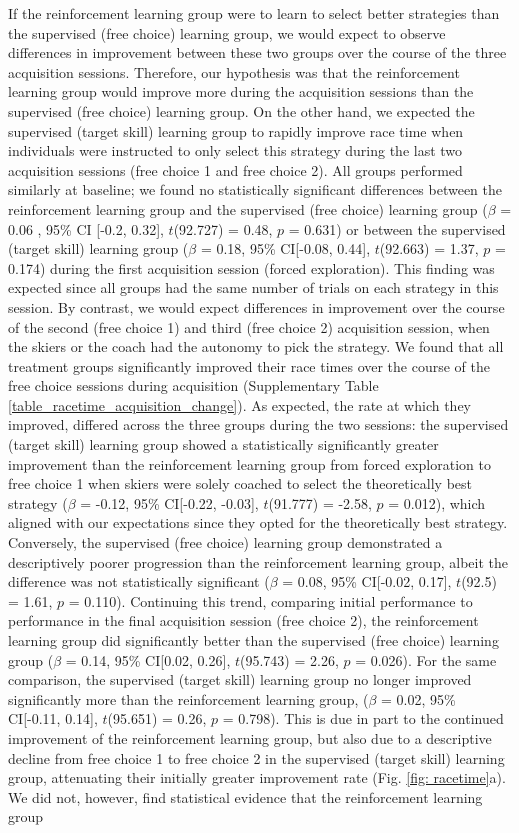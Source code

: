 \documentclass[pdflatex,sn-mathphys-num]{sn-jnl}%
\theoremstyle{thmstyleone}%
\theoremstyle{thmstyletwo}%
\theoremstyle{thmstylethree}%
\begin{document}
If the reinforcement learning group were to learn to select better strategies than the supervised (free choice) learning group, we would expect to observe differences in improvement between these two groups over the course of the three acquisition sessions. Therefore, our hypothesis was that the reinforcement learning group would improve more during the acquisition sessions than the supervised (free choice) learning group. On the other hand, we expected the supervised (target skill) learning group to rapidly improve race time when individuals were instructed to only select this strategy during the last two acquisition sessions (free choice 1 and free choice 2). All groups performed similarly at baseline; we found no statistically significant differences between the reinforcement learning group and the supervised (free choice) learning group ($\beta$ = 0.06 , 95\% CI [-0.2, 0.32], $t$(92.727) = 0.48, $p$ = 0.631) or between the supervised (target skill) learning group ($\beta$ = 0.18, 95\% CI[-0.08, 0.44], $t$(92.663) = 1.37, $p$ = 0.174) during the first acquisition session (forced exploration). This finding was expected since all groups had the same number of trials on each strategy in this session. By contrast, we would expect differences in improvement over the course of the second (free choice 1) and third (free choice 2) acquisition session, when the skiers or the coach had the autonomy to pick the strategy. We found that all treatment groups significantly improved their race times over the course of the free choice sessions during acquisition (Supplementary Table \ref{table_racetime_acquisition_change}). As expected, the rate at which they improved, differed across the three groups during the two sessions: the supervised (target skill) learning group showed a statistically significantly greater improvement than the reinforcement learning group from forced exploration to free choice 1 when skiers were solely coached to select the theoretically best strategy ($\beta$ = -0.12, 95\% CI[-0.22, -0.03], $t$(91.777) = -2.58, $p$ = 0.012), which aligned with our expectations since they opted for the theoretically best strategy. Conversely, the supervised (free choice) learning group demonstrated a descriptively poorer progression than the reinforcement learning group, albeit the difference was not statistically significant ($\beta$ = 0.08, 95\% CI[-0.02, 0.17], $t$(92.5) = 1.61, $p$ = 0.110). Continuing this trend, comparing initial  performance to performance in the final acquisition session (free choice 2), the reinforcement learning group did significantly better than the supervised (free choice) learning group ($\beta$ = 0.14, 95\% CI[0.02, 0.26], $t$(95.743) = 2.26, $p$ = 0.026). For the same comparison, the supervised (target skill) learning group no longer improved significantly more than the reinforcement learning group, ($\beta$ = 0.02, 95\% CI[-0.11, 0.14], $t$(95.651) = 0.26, $p$ = 0.798). This is due in part to the continued improvement of the reinforcement learning group, but also due to a descriptive decline from free choice 1 to free choice 2 in the supervised (target skill) learning group, attenuating their initially greater improvement rate (Fig. \ref{fig: racetime}a). We did not, however, find statistical evidence that the reinforcement learning group 
\end{document}

